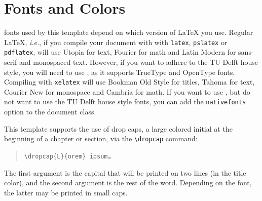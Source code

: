 \section{Fonts and Colors}

 fonts used by this template depend on which version of \LaTeX{} you use. Regular \LaTeX, \emph{i.e.}, if you compile your document with with \texttt{latex}, \texttt{pslatex} or \texttt{pdflatex}, will use Utopia for text, Fourier for math and Latin Modern for sans-serif and monospaced text. However, if you want to adhere to the TU Delft house style, you will need to use \XeLaTeX, as it supports TrueType and OpenType fonts. Compiling with \texttt{xelatex} will use Bookman Old Style for titles, Tahoma for text, Courier New for monospace and Cambria for math. If you want to use \XeLaTeX, but do not want to use the TU Delft house style fonts, you can add the \texttt{nativefonts} option to the document class.

This template supports the use of drop caps, a large colored initial at the beginning of a chapter or section, via the \texttt{\textbackslash dropcap} command:

\begin{quote}
\texttt{\textbackslash dropcap\{L\}\{orem\} ipsum\ldots}
\end{quote}
The first argument is the capital that will be printed on two lines (in the title color), and the second argument is the rest of the word. Depending on the font, the latter may be printed in small caps.

